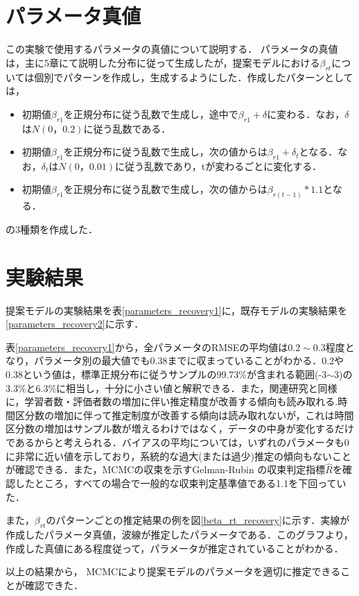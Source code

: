 \documentclass[a4paper,11pt,oneside,openany]{jsbook}
\begin{document}
\section{パラメータ真値}
この実験で使用するパラメータの真値について説明する．
パラメータの真値は，主に5章にて説明した分布に従って生成したが，提案モデルにおける$\beta_{rt}$については個別でパターンを作成し，生成するようにした．作成したパターンとしては，
\begin{itemize}
\item 初期値$\beta_{r1}$を正規分布に従う乱数で生成し，途中で$\beta_{r1}+\delta$に変わる．なお，$\delta$は$N(0，0.2)$に従う乱数である．
\item 初期値$\beta_{r1}$を正規分布に従う乱数で生成し，次の値からは$\beta_{r1}+\delta_t$となる．なお，$\delta_t$は$N(0，0.01)$に従う乱数であり，tが変わるごとに変化する．
\item 初期値$\beta_{r1}$を正規分布に従う乱数で生成し，次の値からは$\beta_{r(t-1)}*1.1$となる．
\end{itemize}
の3種類を作成した．
\section{実験結果}
提案モデルの実験結果を表\ref{parameters_recovery1}に，既存モデルの実験結果を\ref{parameters_recovery2}に示す．

表\ref{parameters_recovery1}から，全パラメータのRMSEの平均値は$0.2\sim0.3$程度となり，パラメータ別の最大値でも0.38までに収まっていることがわかる．0.2や0.38という値は，標準正規分布に従うサンプルの99.73\%が含まれる範囲(-3$\sim$3)の3.3\%と6.3\%に相当し，十分に小さい値と解釈できる．また，関連研究と同様に，学習者数・評価者数の増加に伴い推定精度が改善する傾向も読み取れる.時間区分数の増加に伴って推定制度が改善する傾向は読み取れないが，これは時間区分数の増加はサンプル数が増えるわけではなく，データの中身が変化するだけであるからと考えられる．バイアスの平均については，いずれのパラメータも0に非常に近い値を示しており，系統的な過大(または過少)推定の傾向もないことが確認できる．また，MCMCの収束を示すGelman-Rubin の収束判定指標$ \hat{R} $\cite{RhatRubin,RhatCarlin}を確認したところ，すべての場合で一般的な収束判定基準値である1.1を下回っていた．

また，$\beta_{rt}$のパターンごとの推定結果の例を図\ref{beta_rt_recovery}に示す．実線が作成したパラメータ真値，波線が推定したパラメータである．このグラフより，作成した真値にある程度従って，パラメータが推定されていることがわかる．

以上の結果から， MCMCにより提案モデルのパラメータを適切に推定できることが確認できた．
\end{document}
